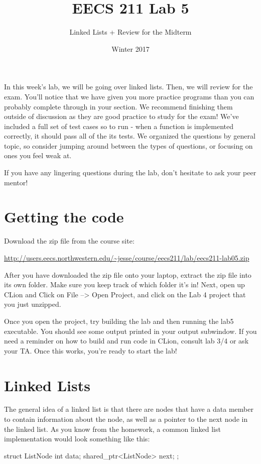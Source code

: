 \documentclass{tufte-handout}
\title{EECS 211 Lab 5}
\author{Linked Lists + Review for the Midterm}
\date{Winter 2017}
\begin{document}
\maketitle

In this week's lab, we will be going over linked lists. Then, we will review for the exam.
You'll notice that we have given you more practice programs than you can probably complete through in your section. We recommend finishing them outside of discussion as they are good practice to study for the exam! 
We've included a full set of test cases so to run - when a function is implemented correctly, it should pass all of the its tests.
We organized the questions by general topic, so consider jumping around between the types of questions, or focusing on ones you feel weak at.

If you have any lingering questions during the lab, don't hesitate to ask your peer mentor!
\section{Getting the code}
Download the zip file from the course site: \medskip

\url{http://users.eecs.northwestern.edu/~jesse/course/eecs211/lab/eecs211-lab05.zip}

\medskip \noindent
After you have downloaded the zip file onto your laptop, extract the zip file into its own folder. Make sure you keep track of which folder it's in!  Next, open up CLion and Click on File --> Open Project, and click on the Lab 4 project that you just unzipped. 

Once you open the project, try building the lab and then running the lab5 executable. 
You should see some output printed in your output subwindow.
If you need a reminder on how to build and run code in CLion, consult lab 3/4 or ask your TA.
Once this works, you're ready to start the lab!

\section{Linked Lists}
The general idea of a linked list is that there are nodes that have a data member to contain information about the node, as well as a pointer to the next node in the linked list.  
As you know from the homework, a common linked list implementation would look something like this:

\begin{Code}
struct ListNode
{
    int data;
    shared_ptr<ListNode> next;
};
\end{Code}
\end{document}
